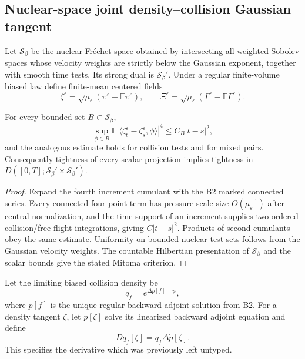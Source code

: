 \subsection{Nuclear-space joint density--collision Gaussian tangent}

Let \(\mathscr S_\beta\) be the nuclear Fr\'echet space obtained by intersecting
all weighted Sobolev spaces whose velocity weights are strictly below the
Gaussian exponent, together with smooth time tests.  Its strong dual is
\(\mathscr S_\beta'\).  Under a regular finite-volume biased law define
finite-mean centered fields
\[
 \zeta^\varepsilon
 =\sqrt{\mu_\varepsilon}
 (\pi^\varepsilon-\mathbb E\pi^\varepsilon),
 \qquad
 \Xi^\varepsilon
 =\sqrt{\mu_\varepsilon}
 (\Gamma^\varepsilon-\mathbb E\Gamma^\varepsilon).
\]

\begin{lemma}
\label{lem:r4-b3-tightness}
For every bounded set \(B\subset\mathscr S_\beta\),
\[
 \sup_{\phi\in B}
 \mathbb E|\langle\zeta_t^\varepsilon-\zeta_s^\varepsilon,\phi\rangle|^4
 \le C_B|t-s|^2,
\]
and the analogous estimate holds for collision tests and for mixed pairs.
Consequently tightness of every scalar projection implies tightness in
\(D([0,T];\mathscr S_\beta'\times\mathscr S_\beta')\).
\end{lemma}

\begin{proof}
Expand the fourth increment cumulant with the B2 marked connected series.
Every connected four-point term has pressure-scale size
\(O(\mu_\varepsilon^{-1})\) after central normalization, and the time support
of an increment supplies two ordered collision/free-flight integrations,
giving \(C|t-s|^2\).  Products of second cumulants obey the same estimate.
Uniformity on bounded nuclear test sets follows from the Gaussian velocity
weights.  The countable Hilbertian presentation of \(\mathscr S_\beta\) and
the scalar bounds give the stated Mitoma criterion.
\end{proof}

Let the limiting biased collision density be
\[
 q_f=e^{\Delta p[f]+\psi},
\]
where \(p[f]\) is the unique regular backward adjoint solution from B2.  For a
density tangent \(\zeta\), let \(\dot p[\zeta]\) solve its linearized backward
adjoint equation and define
\[
 Dq_f[\zeta]=q_f\Delta\dot p[\zeta].
\]
This specifies the derivative which was previously left untyped.

